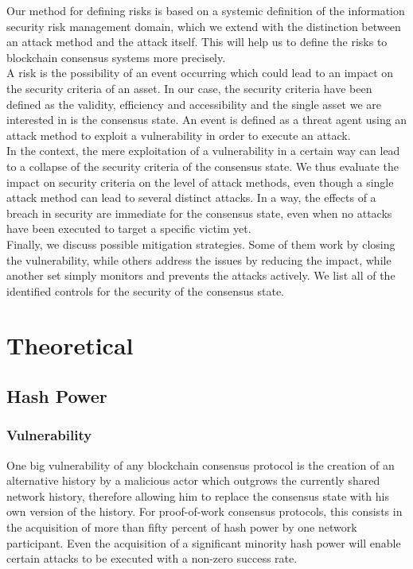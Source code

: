 \documentclass[11pt,a4paper,draft]{article}
\begin{document}
Our method for defining risks is based on a systemic definition of the information security risk management domain, which we extend with the distinction between an attack method and the attack itself. This will help us to define the risks to blockchain consensus systems more precisely.\\

A risk is the possibility of an event occurring which could lead to an impact on the security criteria of an asset. In our case, the security criteria have been defined as the validity, efficiency and accessibility and the single asset we are interested in is the consensus state. An event is defined as a threat agent using an attack method to exploit a vulnerability in order to execute an attack.\\

In the context, the mere exploitation of a vulnerability in a certain way can lead to a collapse of the security criteria of the consensus state. We thus evaluate the impact on security criteria on the level of attack methods, even though a single attack method can lead to several distinct attacks. In a way, the effects of a breach in security are immediate for the consensus state, even when no attacks have been executed to target a specific victim yet.\\

Finally, we discuss possible mitigation strategies. Some of them work by closing the vulnerability, while others address the issues by reducing the impact, while another set simply monitors and prevents the attacks actively. We list all of the identified controls for the security of the consensus state.\\

\section{Theoretical}

\subsection{Hash Power}

\subsubsection{Vulnerability}

One big vulnerability of any blockchain consensus protocol is the creation of an alternative history by a malicious actor which outgrows the currently shared network history, therefore allowing him to replace the consensus state with his own version of the history. For proof-of-work consensus protocols, this consists in the acquisition of more than fifty percent of hash power by one network participant. Even the acquisition of a significant minority hash power will enable certain attacks to be executed with a non-zero success rate.\\
\end{document}
